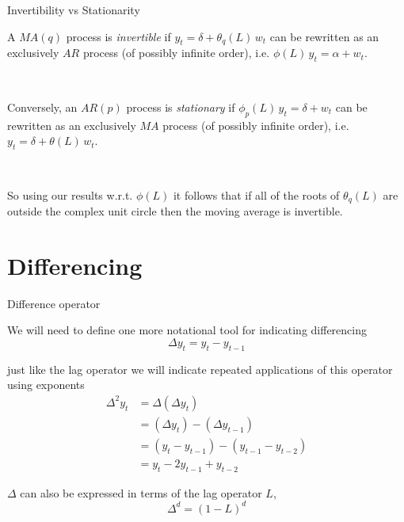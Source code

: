 \documentclass[11pt,ignorenonframetext,]{beamer}
\begin{document}
\begin{frame}[t]{%
\protect\hypertarget{invertibility-vs-stationarity}{%
Invertibility vs Stationarity}}

A \(MA(q)\) process is \emph{invertible} if
\(y_t = \delta + \theta_q(L) \, w_t\) can be rewritten as an exclusively
\(AR\) process (of possibly infinite order), i.e.
\(\phi(L) \, y_t = \alpha + w_t\).

\(~\)

\pause

Conversely, an \(AR(p)\) process is \emph{stationary} if
\(\phi_p(L) \, y_t = \delta + w_t\) can be rewritten as an exclusively
\(MA\) process (of possibly infinite order), i.e.
\(y_t = \delta + \theta(L) \, w_t\).

\(~\)

\pause

So using our results w.r.t. \(\phi(L)\) it follows that if all of the
roots of \(\theta_q(L)\) are outside the complex unit circle then the
moving average is invertible.

\end{frame}

\hypertarget{differencing}{%
\section{Differencing}\label{differencing}}

\begin{frame}{%
\protect\hypertarget{difference-operator}{%
Difference operator}}

We will need to define one more notational tool for indicating
differencing \[ \Delta y_t = y_t - y_{t-1} \]

just like the lag operator we will indicate repeated applications of
this operator using exponents \[ 
\begin{aligned}
\Delta^2 y_t 
  &= \Delta (\Delta y_t) \\
  &= (\Delta y_t) - (\Delta y_{t-1}) \\
  &= (y_t - y_{t-1}) - (y_{t-1} - y_{t-2}) \\
  &= y_t - 2y_{t-1}+y_{t-2}
\end{aligned}
\]

\(\Delta\) can also be expressed in terms of the lag operator \(L\),
\[ \Delta^d = (1-L)^d \]

\end{frame}
\end{document}
